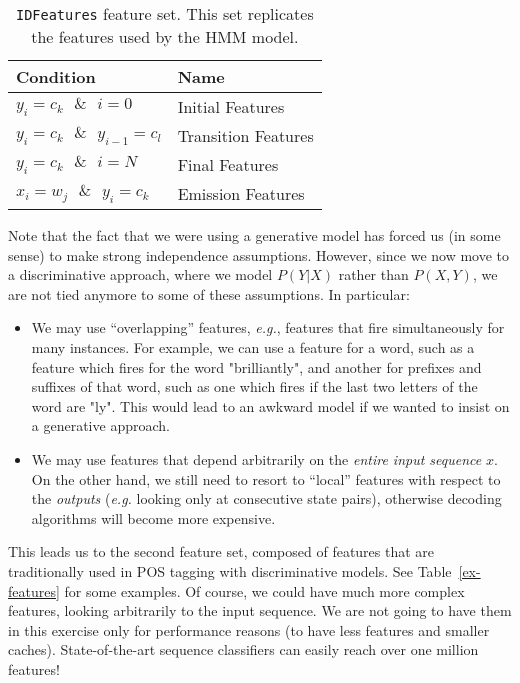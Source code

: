 \begin{table}[h!]
\begin{center}
\begin{tabular}{|l|l|}
\hline
Condition & Name\\
\hline
$y_i = c_k \text{  } \& \text{  } i =0 $& Initial Features \\
\hline
$y_i = c_k \text{  } \& \text{  } y_{i-1} = c_l$& Transition Features \\
\hline
$y_i = c_k \text{  } \& \text{  } i = N$& Final Features \\
\hline
$x_i = w_j \text{  } \& \text{  } y_i = c_k$ & Emission Features \\
\hline
\end{tabular}
\caption{\label{id-features} {\tt IDFeatures} feature set. This set
  replicates the features used by the HMM model.}
\end{center}
\end{table}
 
 
Note that the fact that we were using a generative model has forced us (in some sense) to 
make strong independence assumptions. 
However, since we now move to a discriminative approach, where we model $P(Y|X)$ rather than $P(X,Y)$, we are not tied anymore to 
some of these assumptions. In particular: 
\begin{itemize}
\item We may use ``overlapping'' features, \emph{e.g.}, features that fire simultaneously for many instances. 
For example, we can use a feature for a word, such as a feature which fires for the word "brilliantly", and another for prefixes and suffixes of that word, such as one which fires if the last two letters of the word are "ly".
This would lead to an awkward model if we wanted to insist on a generative approach. 
\item We may use features that depend arbitrarily on the \emph{entire input sequence} $x$. On the other hand, 
we still need to resort to ``local'' features with respect to the \emph{outputs} (\emph{e.g.} looking only at consecutive state pairs), 
otherwise decoding algorithms will become more expensive.  
\end{itemize}


This leads us to the second feature set, composed of features that are traditionally used in POS tagging with discriminative models. See Table~\ref{ex-features} for some examples.
Of course, we could have much more complex features, looking arbitrarily to 
the input sequence. We are not going to have them in this
exercise only for performance reasons (to have less features and smaller caches). State-of-the-art sequence classifiers can easily reach over one million features!

